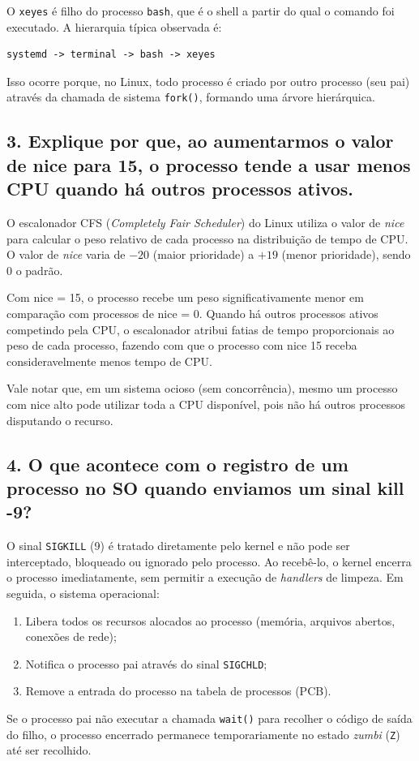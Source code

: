 \documentclass[12pt,a4paper]{article}
\begin{document}
O \texttt{xeyes} é filho do processo \texttt{bash}, que é o shell a partir do qual o comando foi executado. A hierarquia típica observada é:

\begin{lstlisting}
systemd -> terminal -> bash -> xeyes
\end{lstlisting}

Isso ocorre porque, no Linux, todo processo é criado por outro processo (seu pai) através da chamada de sistema \texttt{fork()}, formando uma árvore hierárquica.

\subsection*{3. Explique por que, ao aumentarmos o valor de nice para 15, o processo tende a usar menos CPU quando há outros processos ativos.}

O escalonador CFS (\textit{Completely Fair Scheduler}) do Linux utiliza o valor de \textit{nice} para calcular o peso relativo de cada processo na distribuição de tempo de CPU. O valor de \textit{nice} varia de $-20$ (maior prioridade) a $+19$ (menor prioridade), sendo 0 o padrão.

Com nice = 15, o processo recebe um peso significativamente menor em comparação com processos de nice = 0. Quando há outros processos ativos competindo pela CPU, o escalonador atribui fatias de tempo proporcionais ao peso de cada processo, fazendo com que o processo com nice 15 receba consideravelmente menos tempo de CPU.

Vale notar que, em um sistema ocioso (sem concorrência), mesmo um processo com nice alto pode utilizar toda a CPU disponível, pois não há outros processos disputando o recurso.

\subsection*{4. O que acontece com o registro de um processo no SO quando enviamos um sinal kill -9?}

O sinal \texttt{SIGKILL} (9) é tratado diretamente pelo kernel e não pode ser interceptado, bloqueado ou ignorado pelo processo. Ao recebê-lo, o kernel encerra o processo imediatamente, sem permitir a execução de \textit{handlers} de limpeza. Em seguida, o sistema operacional:

\begin{enumerate}
  \item Libera todos os recursos alocados ao processo (memória, arquivos abertos, conexões de rede);
  \item Notifica o processo pai através do sinal \texttt{SIGCHLD};
  \item Remove a entrada do processo na tabela de processos (PCB).
\end{enumerate}

Se o processo pai não executar a chamada \texttt{wait()} para recolher o código de saída do filho, o processo encerrado permanece temporariamente no estado \textit{zumbi} (\texttt{Z}) até ser recolhido.
\end{document}
